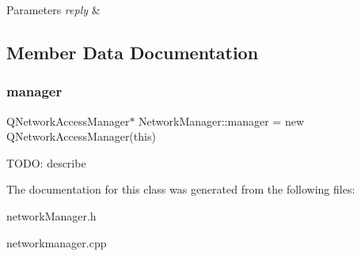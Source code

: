 \begin{DoxyParams}{Parameters}
{\em reply} & \\
\hline
\end{DoxyParams}


\subsection{Member Data Documentation}
\mbox{\label{classNetworkManager_a191750af919d6240039974a5b6f35ee2}} 
\subsubsection{\texorpdfstring{manager}{manager}}
{\footnotesize\ttfamily Q\+Network\+Access\+Manager$\ast$ Network\+Manager\+::manager = new Q\+Network\+Access\+Manager(this)}

T\+O\+DO\+: describe 

The documentation for this class was generated from the following files\+:\begin{DoxyCompactItemize}
\item 
network\+Manager.\+h\item 
networkmanager.\+cpp\end{DoxyCompactItemize}
